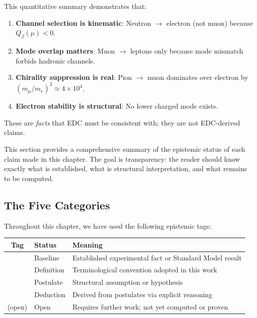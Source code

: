 This quantitative summary demonstrates that:
\begin{enumerate}[nosep]
  \item \textbf{Channel selection is kinematic}: Neutron $\to$ electron (not muon)
        because $Q_\beta(\mu) < 0$.
  \item \textbf{Mode overlap matters}: Muon $\to$ leptons only because mode mismatch
        forbids hadronic channels.
  \item \textbf{Chirality suppression is real}: Pion $\to$ muon dominates over
        electron by $(m_\mu/m_e)^2 \approx 4 \times 10^4$.
  \item \textbf{Electron stability is structural}: No lower charged mode exists.
\end{enumerate}

These are \emph{facts} that EDC must be consistent with; they are not EDC-derived
claims.

\vspace{1em}

This section provides a comprehensive summary of the epistemic status of each
claim made in this chapter. The goal is transparency: the reader should know
exactly what is established, what is structural interpretation, and what
remains to be computed.

\subsection{The Five Categories}

Throughout this chapter, we have used the following epistemic tags:

\begin{center}
\begin{tabular}{clp{8cm}}
\toprule
\textbf{Tag} & \textbf{Status} & \textbf{Meaning} \\
\midrule
\tagBL{} & Baseline & Established experimental fact or Standard Model result \\
 & Definition & Terminological convention adopted in this work \\
\tagP{} & Postulate & Structural assumption or hypothesis \\
\tagDc{} & Deduction & Derived from postulates via explicit reasoning \\
(open) & Open & Requires further work; not yet computed or proven \\
\bottomrule
\end{tabular}
\end{center}

